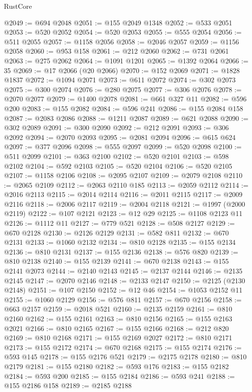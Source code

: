 \begin{lexlean}{RustCore}
\begin{coremodule}
@2049 := @694 @2048
@2051 := @155 @2049 @1348
@2052 := @533 @2051
@2053 := @520 @2052
@2054 := @520 @2053
@2055 := @555 @2054
@2056 := @511 @2055
@2057 := @1158 @2056
@2058 := @2046 @2057
@2059 := @1156 @2058
@2060 := @953 @158
@2061 := @212 @2060
@2062 := @731 @2061
@2063 := @275 @2062
@2064 := @1091 @1201
@2065 := @1392 @2064
@2066 := 35
@2069 := @17 @2066 (@20 @2066)
@2070 := @152 @2069
@2071 := @1828 @1837
@2072 := @1094 @2071
@2073 := @611 @2072
@2074 := @302 @2073
@2075 := @300 @2074
@2076 := @280 @2075
@2077 := @306 @2076
@2078 := @2070 @2077
@2079 := @1400 @2078
@2081 := @661 @327 @11
@2082 := @596 @200
@2083 := @155 @2082
@2084 := @596 @241
@2086 := @155 @2084 @158
@2087 := @2083 @2086
@2088 := @1211 @2087
@2089 := @621 @2088
@2090 := @302 @2089
@2091 := @300 @2090
@2092 := @212 @2091
@2093 := @306 @2092
@2094 := @2070 @2093
@2095 := @2081 @2094
@2096 := @615 @624
@2097 := @377 @2096
@2098 := @555 @2097
@2099 := @520 @2098
@2100 := @511 @2099
@2101 := @363 @2100
@2102 := @520 @2101
@2103 := @598 @2102
@2104 := @592 @2103
@2105 := @520 @2104
@2106 := @520 @2105
@2107 := @1158 @2106
@2108 := @2095 @2107
@2109 := @2079 @2108
@2110 := @2065 @2109
@2112 := @2063 @2110 @185
@2113 := @2059 @2112
@2114 := @2016 @2113
@2115 := @2014 @2114
@2116 := @2011 @2115
@2117 := @2009 @2116
@2118 := @2006 @2117
@2119 := @2004 @2118
@2121 := @1997 (@2000 @2119)
@2122 := @107 @2121
@2123 := @12 @29
@2125 := @1108 @2123 @11
@2126 := @1112 @11
@2127 := @779 @521
@2128 := @508 @2127
@2129 := @670 @2128
@2130 := @2126 @2129
@2131 := @582 @811
@2132 := @670 @2131
@2133 := @1060 @2132
@2134 := @810 @2128
@2135 := @155 @2134
@2136 := @810 @2131
@2137 := @155 @2136
@2138 := @576 @820
@2139 := @810 @2138
@2140 := @155 @2139
@2141 := @670 @2138
@2143 := @155 @2141 @2073
@2144 := @2140 @2143
@2145 := @2137 @2144
@2146 := @2135 @2145
@2147 := @2070 @2146
@2148 := @2133 @2147
@2150 := @2125 (@2130 @2148)
@2151 := @107 @2150
@2152 := @12 @46
@2154 := @1053 @2152 @11
@2155 := @1060 @2129
@2156 := @576 @811
@2157 := @670 @2156
@2158 := @663 @2157
@2159 := @2018 @521
@2160 := @2135 @2159
@2161 := @810 @2160
@2162 := @155 @2161
@2163 := @810 @2156
@2165 := @155 @2163 @2021
@2166 := @810 @2165
@2167 := @155 @2166
@2168 := @212 @820
@2169 := @810 @2168
@2171 := @155 @2169 @2027
@2172 := @810 @2171
@2173 := @155 @2172
@2174 := @670 @2168
@2175 := @155 @2174
@2176 := @593 @145
@2178 := @155 @2176 @521
@2179 := @2175 @2178
@2180 := @810 @2179
@2181 := @155 @2180
@2182 := @593 @176
@2183 := @155 @2182
@2184 := @593 @200
@2185 := @155 @2184
@2186 := @593 @241
@2188 := @155 @2186 @158
@2189 := @2185 @2188

\end{coremodule}
\end{lexlean}
